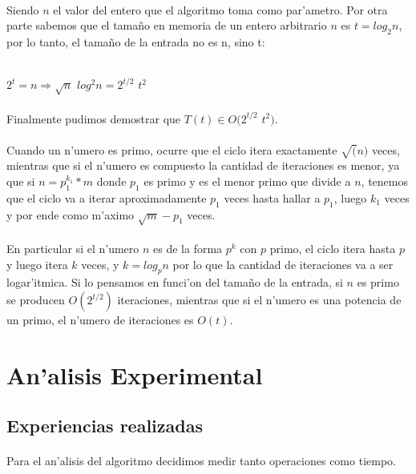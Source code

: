 \paragraph{}
Siendo $n$ el valor del entero que el algoritmo toma como par'ametro. Por otra parte sabemos que 
el tama\~{n}o en memoria de un entero arbitrario $n$ es $t = log_2 n$, por lo tanto, el tama\~{n}o de la entrada no es n, sino t:\\
\\
\centerline{$2^t = n \Rightarrow \sqrt{n}$ $log^2 n = 2^{t/2}$ $t^2$}
\paragraph{}
Finalmente pudimos demostrar que $T(t) \in O(2^{t/2} $ $t^2)$.
\paragraph{}
Cuando un n'umero es primo, ocurre que el ciclo itera exactamente $\sqrt(n)$ veces, mientras que si el n'umero es 
compuesto la cantidad de iteraciones es menor, ya que si $n = p_{1}^{k_{1}}*m$ donde $p_1$ es primo y es el menor 
primo que divide a $n$, tenemos que el ciclo va a iterar aproximadamente $p_1$ veces hasta hallar a $p_1$, luego 
$k_1$ veces y por ende como m'aximo $\sqrt{m}-p_1$ veces.
\paragraph{}
En particular si el n'umero $n$ es de la forma $p^k$ con $p$ primo, el ciclo itera hasta $p$ y luego itera $k$ veces,
y $k=log_p n$ por lo que la cantidad de iteraciones va a ser logar'itmica. Si lo pensamos en funci'on del 
tama\~{n}o de la entrada, si $n$ es primo se producen $O(2^{t/2})$ iteraciones, mientras que si el n'umero es 
una potencia de un primo, el n'umero de iteraciones es $O(t)$.

\section{An'alisis Experimental}
\subsection{Experiencias realizadas}
\paragraph{}
Para el an'alisis del algoritmo decidimos medir tanto operaciones como tiempo. 
